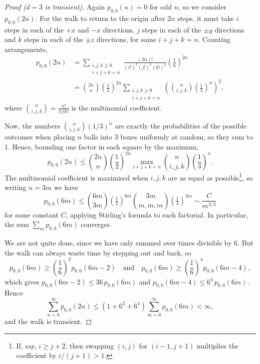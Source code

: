 \begin{proof}[Proof ($d = 3$ is transient)]
	Again $p_{0, 0}(n) = 0$ for odd $n$, so we consider $p_{0, 0}(2n)$. For the walk to return to the origin after $2n$ steps, it must take $i$ steps in each of the $+x$ and $-x$ directions, $j$ steps in each of the $\pm y$ directions and $k$ steps in each of the $\pm z$ directions, for some $i + j + k = n$. Counting arrangements,
	\begin{align*}
	p_{0, 0}(2n) &= \sum_{\substack{i, j, k \geq 0 \\ i + j + k = n}} \frac{(2n)!}{(i!)^2 (j!)^2 (k!)^2} \left(\frac{1}{6}\right)^{2n} \\
	&= \binom{2n}{n} \left(\frac{1}{2}\right)^{2n} \sum_{\substack{i, j, k \geq 0 \\ i + j + k = n}} \left(\binom{n}{i, j, k} \left(\frac{1}{3}\right)^{n}\right)^2,
	\end{align*}
	where $\binom{n}{i, j, k} = \frac{n!}{i! j! k!}$ is the multinomial coefficient.

	Now, the numbers $\binom{n}{i, j, k} (1/3)^n$ are exactly the probabilities of the possible outcomes when placing $n$ balls into 3 boxes uniformly at random, so they sum to 1. Hence, bounding one factor in each square by the maximum,
	$$
	p_{0, 0}(2n) \leq \binom{2n}{n} \left(\frac{1}{2}\right)^{2n} \max_{i + j + k = n}\binom{n}{i, j, k} \left(\frac{1}{3}\right)^{n}.
	$$
	The multinomial coefficient is maximised when $i, j, k$ are as equal as possible\footnote{If, say, $i \geq j + 2$, then swapping $(i, j)$ for $(i - 1, j + 1)$ multiplies the coefficient by $i/(j + 1) > 1$.}, so writing $n = 3m$ we have
	$$
	p_{0, 0}(6m) \leq \binom{6m}{3m} \left(\tfrac{1}{2}\right)^{6m} \binom{3m}{m, m, m}\left(\tfrac{1}{3}\right)^{3m} \sim \frac{C}{m^{3/2}}
	$$
	for some constant $C$, applying Stirling's formula to each factorial. In particular, the sum $\sum_{m} p_{0, 0}(6m)$ converges.

	We are not quite done, since we have only summed over times divisible by 6. But the walk can always waste time by stepping out and back, so
	$$
	p_{0, 0}(6m) \geq \left(\frac{1}{6}\right)^2 p_{0, 0}(6m - 2) \quad \text{and} \quad p_{0, 0}(6m) \geq \left(\frac{1}{6}\right)^4 p_{0, 0}(6m - 4),
	$$
	which gives $p_{0, 0}(6m - 2) \leq 36\, p_{0, 0}(6m)$ and $p_{0, 0}(6m - 4) \leq 6^4\, p_{0, 0}(6m)$. Hence
	$$
	\sum_{n = 0}^{\infty} p_{0, 0}(2n) \leq (1 + 6^2 + 6^4)\sum_{m = 0}^{\infty} p_{0, 0}(6m) < \infty,
	$$
	and the walk is transient.
\end{proof}

